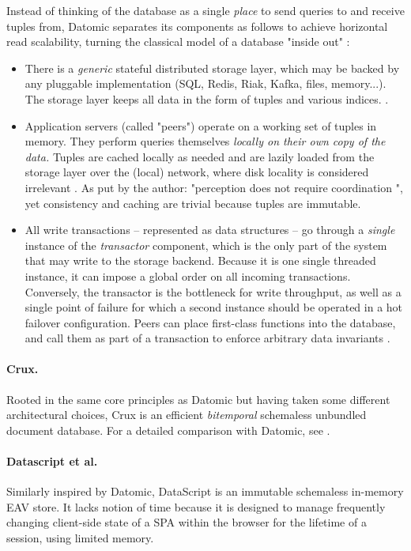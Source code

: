 Instead of thinking of the database as a single \emph{place} to send queries to and receive tuples from, Datomic separates its components as follows to achieve horizontal read scalability, turning the classical model of a database "inside out" \cite{kleppmann2017designing}:
\begin{itemize}
  \item There is a \emph{generic} stateful distributed storage layer, which may be backed by any pluggable implementation (SQL, Redis, Riak, Kafka, files, memory...). The storage layer keeps all data in the form of tuples and various indices. \cite{hickey2019datomic}.
  \item Application servers (called "peers") operate on a working set of tuples in memory. They perform queries themselves \emph{locally on their own copy of the data.} Tuples are cached locally as needed and are lazily loaded from the storage layer over the (local) network, where disk locality is considered irrelevant \cite{ananthanarayanan2011disk}. As put by the author: "perception does not require coordination \cite{hickey2012values}", yet consistency and caching are trivial because tuples are immutable.
  \item All write transactions -- represented as data structures -- go through a \emph{single} instance of the \emph{transactor} component, which is the only part of the system that may write to the storage backend. Because it is one single threaded instance, it can impose a global order on all incoming transactions. Conversely, the transactor is the bottleneck for write throughput, as well as a single point of failure for which a second instance should be operated in a hot failover configuration. Peers can place first-class functions into the database, and call them as part of a transaction to enforce arbitrary data invariants \cite{datomicdocs}.
\end{itemize}


\paragraph{Crux.} Rooted in the same core principles as Datomic but having taken some different architectural choices, Crux is an efficient \emph{bitemporal} schemaless unbundled document database. For a detailed comparison with Datomic, see \cite{juxtcrux}.

\paragraph{Datascript et al.} Similarly inspired by Datomic, DataScript \cite{prokopov15datascript} is an immutable schemaless in-memory EAV store. It lacks notion of time because it is designed to manage frequently changing client-side state of a \gls{SPA} within the browser for the lifetime of a session, using limited memory.

